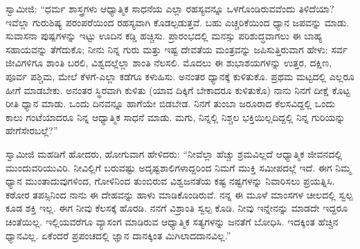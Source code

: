  ಸ್ವಾಮೀಜಿ: “ಧರ್ಮ ಶಾಸ್ತ್ರಗಳು ಆಧ್ಯಾತ್ಮಿಕ ಸಾಧನೆಯ ಎಲ್ಲಾ ರಹಸ್ಯವನ್ನೂ ಒಳಗೊಂಡಿರುವವೆಂದು ತಿಳಿದೆಯಾ? ಇವೆಲ್ಲಾ ಗುರುಶಿಷ್ಯ ಪರಂಪರೆಯಿಂದ ರಹಸ್ಯವಾಗಿ ಕೊಡಲ್ಪಡುತ್ತವೆ. ಬಹು ಎಚ್ಚರಿಕೆಯಿಂದ ಧ್ಯಾನ ಜಪವನ್ನು ಮಾಡು. ಸುವಾಸನಾ ಪುಷ್ಪಗಳನ್ನು ಇಟ್ಟು ಊದಿನ ಕಡ್ಡಿ ಹಚ್ಚಿಸು. ಪ್ರಾರಂಭದಲ್ಲಿ ಮನಸ್ಸು ಪರಿಶುದ್ಧವಾಗಲು ಈ ಬಾಹ್ಯ ಸಹಾಯವನ್ನು ತೆಗೆದುಕೊ; ನೀನು ನಿನ್ನ ಗುರು ಮತ್ತು ಇಷ್ಟ ದೇವತೆಯ ಮಂತ್ರವನ್ನು ಜಪಿಸುತ್ತಿರುವಾಗ ಹೇಳು: ಸರ್ವ ಜೀವಿಗಳಿಗೂ ಶಾಂತಿ ಬರಲಿ, ವಿಶ್ವದಲ್ಲೆಲ್ಲಾ ಶಾಂತಿ ನೆಲಸಲಿ. ಮೊದಲು ಈ ಶುಭಾಶಯಗಳನ್ನು ಉತ್ತರ, ದಕ್ಷಿಣ, ಪೂರ್ವ ಪಶ್ಚಿಮ, ಮೇಲೆ ಕೆಳಗೆ-ಎಲ್ಲಾ ಕಡೆಗೂ ಕಳುಹಿಸು. ಅನಂತರ ಧ್ಯಾನಕ್ಕೆ ಕುಳಿತುಕೊ. ಪ್ರಥಮ ಮಟ್ಟದಲ್ಲಿ ಎಲ್ಲರೂ ಹೀಗೆ ಮಾಡಬೇಕು. ಅನಂತರ ಸ್ಥಿರವಾಗಿ ಕುಳಿತು (ಯಾವ ದಿಕ್ಕಿಗೆ ಬೇಕಾದರೂ ಕುಳಿತುಕೊ) ನಾನು ನಿನಗೆ ದೀಕ್ಷೆ ಕೊಟ್ಟ ರೀತಿ ಧ್ಯಾನ ಮಾಡು. ಒಂದು ದಿನವನ್ನೂ ಹಾಗೆಯೇ ಬಿಡಬೇಡ. ನಿನಗೆ ತುಂಬಾ ಜರೂರಾದ ಕೆಲಸವಿದ್ದಲ್ಲಿ ಒಂದು ಕಾಲು ಗಂಟೆಯಾದರೂ ನಿನ್ನ ಆಧ್ಯಾತ್ಮಿಕ ಸಾಧನೆ ಮಾಡು. ಮಗು, ನಿನ್ನಲ್ಲಿ ನಿಶ್ಚಲ ಭಕ್ತಿಯಿಲ್ಲದಿದ್ದಲ್ಲಿ ನಿನ್ನ ಗುರಿಯನ್ನು ಹೇಗೆ\break ಸೇರಬಲ್ಲೆ?” 

 ಸ್ವಾಮೀಜಿ ಮಹಡಿಗೆ ಹೋದರು, ಹೋಗುವಾಗ ಹೇಳಿದರು: “ನೀವೆಲ್ಲಾ ಹೆಚ್ಚು ಶ್ರಮವಿಲ್ಲದೆ ಆಧ್ಯಾತ್ಮಿಕ ಜೀವನದಲ್ಲಿ ಮುಂದುವರಿಯುವಿರಿ. ನೀವಿಲ್ಲಿಗೆ ಬರುವಷ್ಟು ಅದೃಷ್ಟಶಾಲಿಗಳಾದ್ದರಿಂದ ನಿಮಗೆ ಮುಕ್ತಿ ಸಮೀಪದಲ್ಲೆ ಇದೆ. ಈಗ ನಿಮ್ಮ ಧ್ಯಾನ ಮುಂತಾದುವುಗಳಿಂದ, ಗೋಳಿನಿಂದ ತುಂಬಿರುವ ವಿಶ್ವಜನತೆಯ ಕಷ್ಟ ನಷ್ಟಗಳನ್ನು ನಿವಾರಿಸಲು ಪ್ರಯತ್ನಿಸಿ. ಕಠೋರ ತಪಸ್ಸಿನಿಂದ ನಾನು ಈ ದೇಹವನ್ನು ಹಾಳು ಮಾಡಿಕೊಂಡಿರುವೆ. ನನ್ನ ಈ ಮೂಳೆ ಮಾಂಸಗಳ ಚೀಲದಲ್ಲಿ ಸ್ವಲ್ಪ ಕೂಡ ಶಕ್ತಿ ಇಲ್ಲ. ಈಗ ನೀವು ಕೆಲಸಕ್ಕೆ ಹೊರಡಿ. ನನಗೆ ವಿಶ್ರಾಂತಿ ಸ್ವಲ್ಪ ಕೊಡಿ. ನೀವು ಇನ್ನೇನನ್ನು ಮಾಡದೇ ಇದ್ದರೂ ಚಿಂತೆಯಿಲ್ಲ. ಇಲ್ಲಿಯವರೆಗೂ ವ್ಯಾಸಂಗ ಮಾಡಿರುವ ಆಧ್ಯಾತ್ಮಿಕ ಸತ್ಯಗಳನ್ನು ಜನತೆಗೆ ಬೋಧಿಸಿ. ಇದಕ್ಕಿಂತ ಹೆಚ್ಚಿನ ಧ್ಯಾನವಿಲ್ಲ. ಏಕೆಂದರೆ ಪ್ರಪಂಚದಲ್ಲಿ ಜ್ಞಾನ ದಾನಕ್ಕಿಂತ ಮಿಗಿಲಾದ\break ದಾನವಿಲ್ಲ.” 

